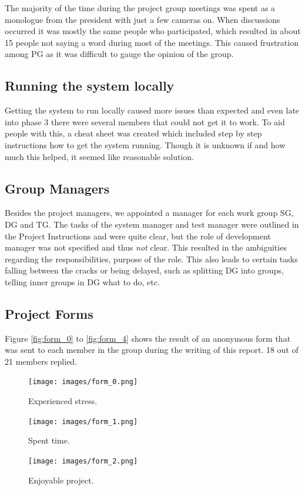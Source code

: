 \documentclass{article}
\begin{document}
        The majority of the time during the project group meetings was
        spent as a monologue from the president with just a few cameras on.
        When discussions occurred it was mostly the same people who participated, which resulted
        in about 15 people not saying a word during most of the meetings.
        This caused frustration among PG as it was difficult to gauge the opinion of the group.
    
    \subsection{Running the system locally \label{system_locally}}
        Getting the system to run locally caused more issues than expected and even late
        into phase 3 there were several members that could not get it to work.
        To aid people with this, a cheat sheet was created which included step by step
        instructions how to get the system running. Though it is unknown if and how
        much this helped, it seemed like reasonable solution.
        
    \subsection{Group Managers}
        Besides the project managers, we appointed a manager for each work group SG, DG and TG. The tasks of the system manager and test manager were outlined in the Project Instructions and were quite clear, but the role of development manager was not specified and thus \emph{not} clear.
        This resulted in the ambiguities regarding the responsibilities, purpose of the role. This also leads to certain tasks falling between the cracks or being
        delayed, such as splitting DG into groups, telling inner groups in DG what to do, etc.

    \subsection{Project Forms}
        Figure \ref{fig:form_0} to \ref{fig:form_4} shows the result of an anonymous form that
        was sent to each member in the group during the writing of this report. 18 out of 21 members
        replied.

        \begin{figure}[!htb]
              \texttt{[image: images/form\_0.png]}
              \caption{Experienced stress.}\label{fig:form_0}
            \endminipage\hfill
              \texttt{[image: images/form\_1.png]}
              \caption{Spent time.}\label{fig:form_1}
            \endminipage\hfill
              \texttt{[image: images/form\_2.png]}
              \caption{Enjoyable project.}\label{fig:form_2}
            \endminipage\hfill
        \end{figure}
\end{document}
